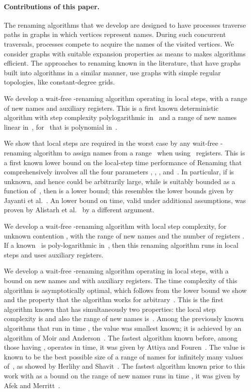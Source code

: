 \documentclass[11pt]{article}
\newcommand{\BBB}{\vspace*{-\bigskipamount}}
\newcommand{\Paragraph}[1]{\BBB\paragraph{#1}}
\begin{document}
\Paragraph{Contributions of this paper.}


The renaming algorithms that we develop are designed to have processes traverse paths in graphs in which vertices represent names.
During such concurrent traversals, processes compete to acquire the names of the visited vertices.
We consider graphs with suitable expansion properties as means to makes algorithms efficient.
The approaches to renaming known in the literature, that have graphs built into algorithms in a similar manner, use graphs with  simple regular topologies, like constant-degree grids.

We develop a wait-free -renaming algorithm operating in  local steps, with a range of new names  and  auxiliary registers.
This is a first known deterministic algorithm with step complexity polylogarithmic in~ and a range of new names  linear in~, for~ that is polynomial in~. 



We show that   local steps are required in the worst case by any wait-free -renaming algorithm to assign names from a  range~ when using~ registers.
This is a first known lower bound on the local-step time performance of Renaming  that comprehensively involves all the four parameters , , , and~.
In particular, if  is unknown, and hence could be arbitrarily large, while  is suitably bounded as a function of~, then  is a lower bound; this resembles the lower bounds given by Jayanti et al.~\cite{JayantiTT00}.
An  lower bound on time, valid under additional assumptions, was proven by Alistarh et al.~\cite{AlistarhACGG14}   by a different argument.

We develop a wait-free -renaming algorithm with  local step complexity, for unknown contention , with the range of new names 
 and the number of registers . 
If a known~ is poly-logarithmic in~, then this renaming algorithm runs in  local steps and uses  auxiliary registers.

We develop a wait-free -renaming algorithm operating in  local steps, with a bound on new names  and with  auxiliary registers.
The time complexity of this algorithm is asymptotically optimal, which follows from the lower bound we show and the property that the algorithm works for arbitrary~.
This is the first algorithm known that has simultaneously two properties: the local step complexity is  and also the range of new names is~.
Among the previously known algorithms that run in time , the value  was smallest known; it is achieved by an algorithm of Moir and Anderson~\cite{MoirA95}.
The fastest algorithm known before, among those having , operates in  time, it was given by Attiya and Fouren~\cite{AttiyaF01}.
The value  is known to be the best possible size of a range of names for infinitely many values of~, as showed by Herlihy and Shavit~\cite{HerlihyS99}. 
The fastest algorithm known prior to this work with  as a bound on the range of new names runs in time , it was given by Afek and Merritt~\cite{AfekM99}.
\end{document}
